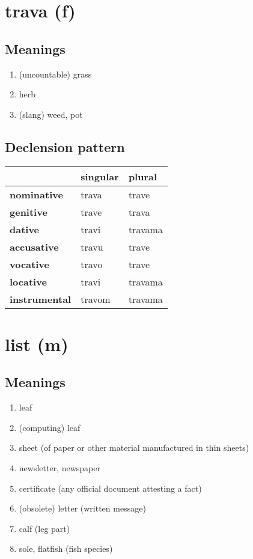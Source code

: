 \filbreak
\section{trava (f)}
\subsection*{Meanings}
\begin{enumerate}
\item (uncountable) grass
\item herb
\item (slang) weed, pot
\end{enumerate}
\subsection*{Declension pattern}
\begin{tabularx}{\linewidth}{Xll}
\toprule
{} & singular &   plural \\
\midrule
\textbf{nominative  } &    trava &    trave \\
\textbf{genitive    } &    trave &    trava \\
\textbf{dative      } &    travi &  travama \\
\textbf{accusative  } &    travu &    trave \\
\textbf{vocative    } &    travo &    trave \\
\textbf{locative    } &    travi &  travama \\
\textbf{instrumental} &   travom &  travama \\
\bottomrule
\end{tabularx}

\filbreak
\section{list (m)}
\subsection*{Meanings}
\begin{enumerate}
\item leaf
\item (computing) leaf
\item sheet (of paper or other material manufactured in thin sheets)
\item newsletter, newspaper
\item certificate (any official document attesting a fact)
\item (obsolete) letter (written message)
\item calf (leg part)
\item sole, flatfish (fish species)
\end{enumerate}

